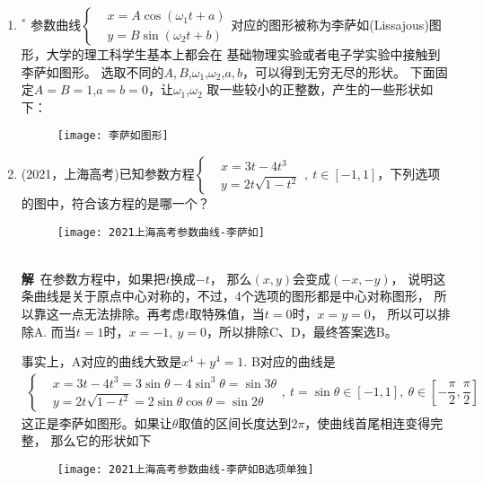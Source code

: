\begin{enumerate}[label={【\textbf{例\thechapter.\arabic*}】},
 leftmargin=\inteval{\myenumleftmargin}pt,
 itemsep=\inteval{\myenumitempsep}pt,
 itemindent=\inteval{\myenumitemindent}pt]
\item $^*$ 参数曲线$ \left\{ \begin{aligned}
    & x=A\cos(\omega_1 t+a) \\
    & y=B\sin(\omega_2 t+b)
\end{aligned}
\right. $对应的图形被称为李萨如(Lissajous)图形，大学的理工科学生基本上都会在
基础物理实验或者电子学实验中接触到李萨如图形。
选取不同的$ A,B $,$ \omega_1 $,$ \omega_2 $,$ a,b $，可以得到无穷无尽的形状。
下面固定$ A=B=1 $,$ a=b=0 $，让$ \omega_1 $,$ \omega_2 $
取一些较小的正整数，产生的一些形状如下：
\begin{figure}[H]
    \centering
    \texttt{[image: 李萨如图形]}
\end{figure}

\item 
(2021，上海高考)已知参数方程$ \left\{ \begin{aligned}
    & x=3t-4t^3 \\
    & y=2t\sqrt{1-t^2}
\end{aligned}
\right.,\ t\in [-1,1] $，下列选项的图中，符合该方程的是哪一个？
\begin{figure}[!htbp]
    \centering
    \texttt{[image: 2021上海高考参数曲线-李萨如]}
\end{figure} \\
\textbf{解}\ 在参数方程中，如果把$ t $换成$ -t $，
那么$ (x,y) $会变成$ (-x,-y) $，
说明这条曲线是关于原点中心对称的，不过，4个选项的图形都是中心对称图形，
所以靠这一点无法排除。再考虑$ t $取特殊值，当$ t=0 $时，$ x=y=0 $，
所以可以排除A. 而当$ t=1 $时，$ x=-1,\ y=0 $，所以排除C、D，最终答案选B。

事实上，A对应的曲线大致是$ x^4+y^4=1 $. B对应的曲线是
\begin{align*}
    \left\{ \begin{aligned}
        & x=3t-4t^3=3\sin\theta-4\sin^3\theta=\sin3\theta \\
        & y=2t\sqrt{1-t^2}=2\sin\theta\cos\theta=\sin2\theta
    \end{aligned}  \right.,\ t=\sin\theta\in [-1,1],\ 
    \theta\in[-\dfrac{\pi}{2},\dfrac{\pi}{2}]
\end{align*}
这正是李萨如图形。如果让$ \theta $取值的区间长度达到$ 2\pi $，使曲线首尾相连变得完整，
那么它的形状如下
\begin{figure}[!htbp]
    \centering
    \texttt{[image: 2021上海高考参数曲线-李萨如B选项单独]}
\end{figure} 


\end{enumerate}

